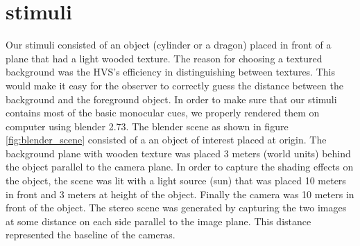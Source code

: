 \section{stimuli}
Our stimuli consisted of an object (cylinder or a dragon) placed in front of a plane that had a light wooded texture. The reason for choosing a textured background was the HVS's efficiency in distinguishing between textures. This would make it easy for the observer to correctly guess the distance between the background and the foreground object. In order to make sure that our stimuli contains most of the basic monocular cues, we properly rendered them on computer using blender 2.73.
The blender scene as shown in figure \ref{fig:blender_scene} consisted of a an object of interest placed at origin. The background plane with wooden texture was placed 3 meters (world units) behind the object parallel to the camera plane. In order to capture the shading effects on the object, the scene was lit with a light source (sun) that was placed 10 meters in front and 3 meters at height of the object. Finally the camera was 10 meters in front of the object. The stereo scene was generated by capturing the two images at some distance on each side parallel to the image plane. This distance represented the baseline of the cameras.

